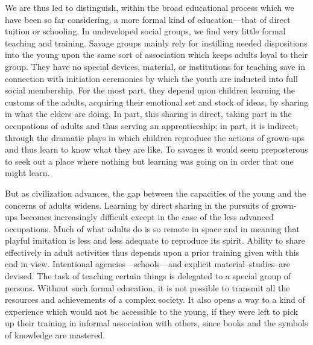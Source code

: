 \begin{linenumbers}
\indent We are thus led to distinguish, within the broad educational process which we have been so far considering, a more formal kind of education—that of direct tuition or schooling. In undeveloped social groups, we find very little formal teaching and training. Savage groups mainly rely for instilling needed dispositions into the young upon the same sort of association which keeps adults loyal to their group. They have no special devices, material, or institutions for teaching save in connection with initiation ceremonies by which the youth are inducted into full social membership. For the most part, they depend upon children learning the customs of the adults, acquiring their emotional set and stock of ideas, by sharing in what the elders are doing. In part, this sharing is direct, taking part in the occupations of adults and thus serving an apprenticeship; in part, it is indirect, through the dramatic plays in which children reproduce the actions of grown-ups and thus learn to know what they are like. To savages it would seem preposterous to seek out a place where nothing but learning was going on in order that one might learn.

\indent But as civilization advances, the gap between the capacities of the young and the concerns of adults widens. Learning by direct sharing in the pursuits of grown-ups becomes increasingly difficult except in the case of the less advanced occupations. Much of what adults do is so remote in space and in meaning that playful imitation is less and less adequate to reproduce its spirit. Ability to share effectively in adult activities thus depends upon a prior training given with this end in view. Intentional agencies—schools—and explicit material--studies--are devised. The task of teaching certain things is delegated to a special group of persons.
Without such formal education, it is not possible to transmit all the resources and achievements of a complex society. It also opens a way to a kind of experience which would not be accessible to the young, if they were left to pick up their training in informal association with others, since books and the symbols of knowledge are mastered.


\end{linenumbers}
